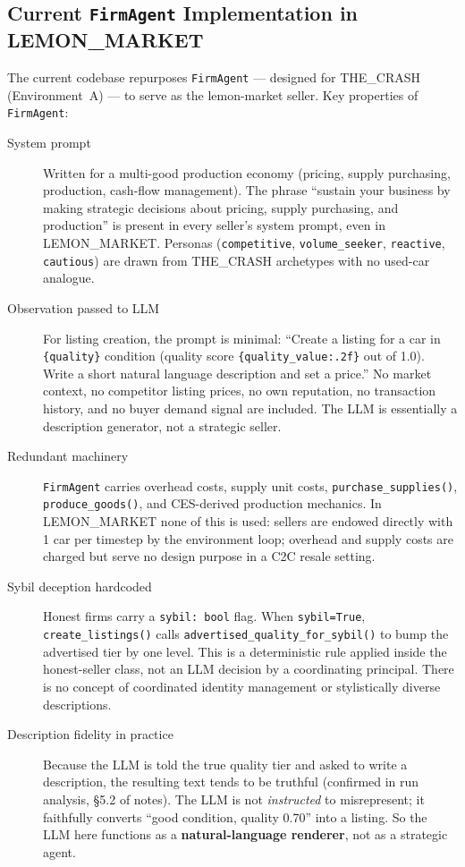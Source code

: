 \documentclass{article}
\begin{document}
\subsection{Current \texttt{FirmAgent} Implementation in LEMON\_MARKET}

The current codebase repurposes \texttt{FirmAgent} --- designed for THE\_CRASH (Environment~A) ---
to serve as the lemon-market seller. Key properties of \texttt{FirmAgent}:

\begin{description}
  \item[System prompt] Written for a multi-good production economy (pricing, supply purchasing,
    production, cash-flow management). The phrase ``sustain your business by making strategic
    decisions about pricing, supply purchasing, and production'' is present in every seller's
    system prompt, even in LEMON\_MARKET. Personas (\texttt{competitive}, \texttt{volume\_seeker},
    \texttt{reactive}, \texttt{cautious}) are drawn from THE\_CRASH archetypes with no used-car
    analogue.

  \item[Observation passed to LLM] For listing creation, the prompt is minimal:
    ``Create a listing for a car in \texttt{\{quality\}} condition (quality score
    \texttt{\{quality\_value:.2f\}} out of 1.0). Write a short natural language description and set
    a price.'' No market context, no competitor listing prices, no own reputation, no transaction
    history, and no buyer demand signal are included. The LLM is essentially a description
    generator, not a strategic seller.

  \item[Redundant machinery] \texttt{FirmAgent} carries overhead costs, supply unit costs,
    \texttt{purchase\_supplies()}, \texttt{produce\_goods()}, and CES-derived production
    mechanics. In LEMON\_MARKET none of this is used: sellers are endowed directly with 1 car
    per timestep by the environment loop; overhead and supply costs are charged but serve no
    design purpose in a C2C resale setting.

  \item[Sybil deception hardcoded] Honest firms carry a \texttt{sybil: bool} flag. When
    \texttt{sybil=True}, \texttt{create\_listings()} calls \texttt{advertised\_quality\_for\_sybil()}
    to bump the advertised tier by one level. This is a deterministic rule applied inside the
    honest-seller class, not an LLM decision by a coordinating principal. There is no concept
    of coordinated identity management or stylistically diverse descriptions.

  \item[Description fidelity in practice] Because the LLM is told the true quality tier and asked
    to write a description, the resulting text tends to be truthful (confirmed in run analysis,
    §5.2 of notes). The LLM is not \emph{instructed} to misrepresent; it faithfully converts
    ``good condition, quality 0.70'' into a listing. So the LLM here functions as a
    \textbf{natural-language renderer}, not as a strategic agent.
\end{description}
\end{document}
